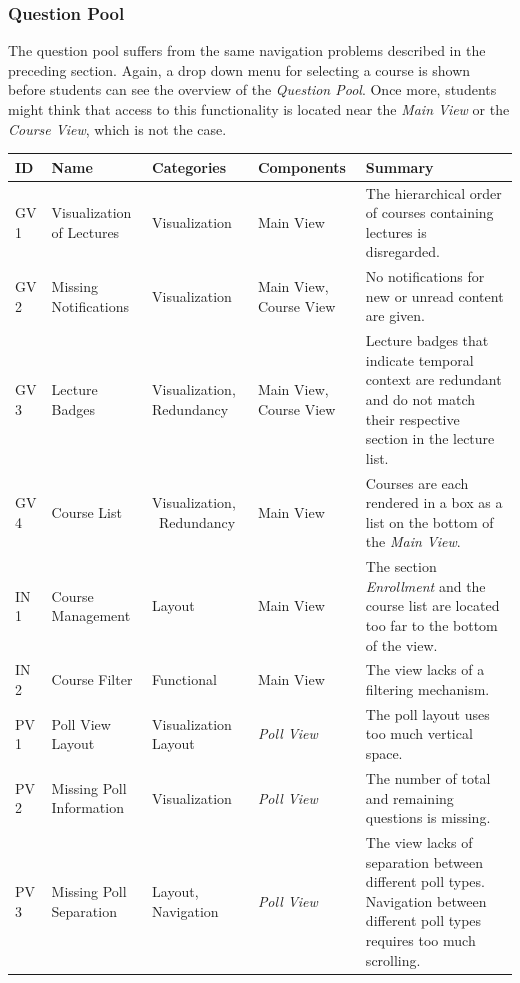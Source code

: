 \subsubsection{Question Pool}

The question pool suffers from the same navigation problems described in the preceding section. Again, a drop down menu for selecting a course is shown before students can see the overview of the \emph{Question Pool}. Once more, students might think that access to this functionality is located near the \emph{Main View} or the \emph{Course View}, which is not the case.
\cleardoublepage
\renewcommand*{\arraystretch}{1.4}
\begin{longtable}{ | p{1.1cm} | p{2cm} | p{2cm} | p{2.5cm} | p{5.5cm} |}
\hline
ID & Name & Categories & Components & Summary \\ \hline \hline
GV 1 & Visualization of Lectures & Visualization & Main View & The hierarchical order of courses containing lectures is disregarded. \\ \hline
GV 2 & Missing Notifications & Visualization & Main View, \newline Course View & No notifications for new or unread content are given. \\ \hline
GV 3 & Lecture Badges & Visualization, \newline Redundancy & Main View, \newline Course View & Lecture badges that indicate temporal context are redundant and do not match their respective section in the lecture list. \\ \hline
GV 4 & Course List & Visualization, \ Redundancy & Main View & Courses are each rendered in a box as a list on the bottom of the \emph{Main View}. \\ \hline
IN 1 & Course Management & Layout & Main View & The section \emph{Enrollment} and the course list are located too far to the bottom of the view. \\ \hline
IN 2 & Course Filter & Functional & Main View & The view lacks of a filtering mechanism. \\ \hline
PV 1 & Poll View Layout & Visualization \newline Layout & \emph{Poll View} & The poll layout uses too much vertical space. \\ \hline
PV 2 & Missing Poll Information & Visualization & \emph{Poll View} & The number of total and remaining questions is missing. \\ \hline
PV 3 & Missing Poll Separation & Layout, \newline Navigation & \emph{Poll View} & The view lacks of separation between different poll types. Navigation between different poll types requires too much scrolling. \\ \hline

\end{longtable}

